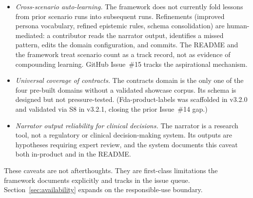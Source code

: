 \begin{itemize}
\item \emph{Cross-scenario auto-learning.} The framework does not currently fold lessons from prior scenario runs into subsequent runs. Refinements (improved persona vocabulary, refined epistemic rules, schema consolidation) are human-mediated: a contributor reads the narrator output, identifies a missed pattern, edits the domain configuration, and commits. The README and the framework treat scenario count as a track record, not as evidence of compounding learning. GitHub Issue~\#15 tracks the aspirational mechanism.
\item \emph{Universal coverage of contracts.} The contracts domain is the only one of the four pre-built domains without a validated showcase corpus. Its schema is designed but not pressure-tested. (Fda-product-labels was scaffolded in v3.2.0 and validated via S8 in v3.2.1, closing the prior Issue~\#14 gap.)
\item \emph{Narrator output reliability for clinical decisions.} The narrator is a research tool, not a regulatory or clinical decision-making system. Its outputs are hypotheses requiring expert review, and the system documents this caveat both in-product and in the README.
\end{itemize}

These caveats are not afterthoughts. They are first-class limitations the framework documents explicitly and tracks in the issue queue. Section~\ref{sec:availability} expands on the responsible-use boundary.
